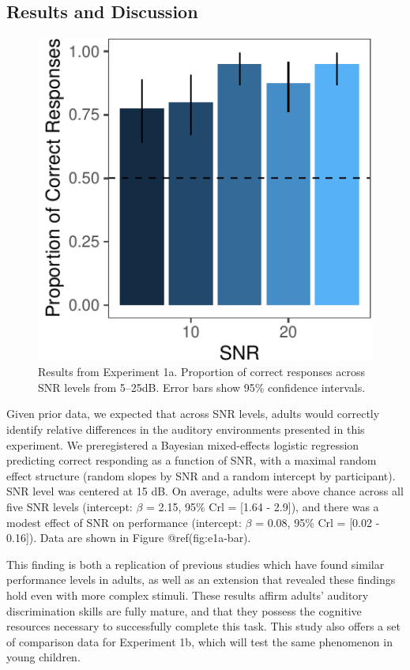 \documentclass[10pt, letterpaper]{article}
\newenvironment{CodeChunk}{}{}
\begin{document}
\hypertarget{results-and-discussion}{%
\subsection{Results and Discussion}\label{results-and-discussion}}

\begin{CodeChunk}
\begin{figure}[t]
\includegraphics{figs/e1a-bar-1} \caption[Results from Experiment 1a]{Results from Experiment 1a. Proportion of correct responses across SNR levels from 5--25dB. Error bars show 95\% confidence intervals.}\label{fig:e1a-bar}
\end{figure}
\end{CodeChunk}

Given prior data, we expected that across SNR levels, adults would
correctly identify relative differences in the auditory environments
presented in this experiment. We preregistered a Bayesian mixed-effects
logistic regression predicting correct responding as a function of SNR,
with a maximal random effect structure (random slopes by SNR and a
random intercept by participant). SNR level was centered at 15 dB. On
average, adults were above chance across all five SNR levels (intercept:
\(\beta\) = 2.15, 95\% Crl = {[}1.64 - 2.9{]}), and there was a modest
effect of SNR on performance (intercept: \(\beta\) = 0.08, 95\% Crl =
{[}0.02 - 0.16{]}). Data are shown in Figure @ref(fig:e1a-bar).

This finding is both a replication of previous studies which have found
similar performance levels in adults, as well as an extension that
revealed these findings hold even with more complex stimuli. These
results affirm adults' auditory discrimination skills are fully mature,
and that they possess the cognitive resources necessary to successfully
complete this task. This study also offers a set of comparison data for
Experiment 1b, which will test the same phenomenon in young children.
\end{document}
